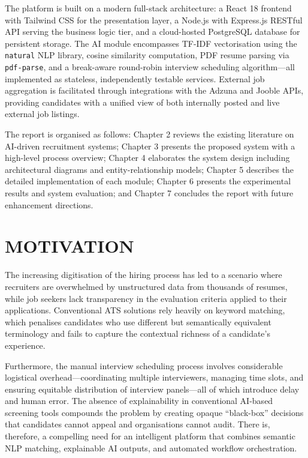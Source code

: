 \documentclass[12pt,a4paper]{report}
\begin{document}
The platform is built on a modern full-stack architecture: a React 18 frontend with Tailwind CSS for the presentation layer, a Node.js with Express.js RESTful API serving the business logic tier, and a cloud-hosted PostgreSQL database for persistent storage. The AI module encompasses TF-IDF vectorisation using the \texttt{natural} NLP library, cosine similarity computation, PDF resume parsing via \texttt{pdf-parse}, and a break-aware round-robin interview scheduling algorithm---all implemented as stateless, independently testable services. External job aggregation is facilitated through integrations with the Adzuna and Jooble APIs, providing candidates with a unified view of both internally posted and live external job listings.

The report is organised as follows: Chapter 2 reviews the existing literature on AI-driven recruitment systems; Chapter 3 presents the proposed system with a high-level process overview; Chapter 4 elaborates the system design including architectural diagrams and entity-relationship models; Chapter 5 describes the detailed implementation of each module; Chapter 6 presents the experimental results and system evaluation; and Chapter 7 concludes the report with future enhancement directions.

\section{MOTIVATION}

The increasing digitisation of the hiring process has led to a scenario where recruiters are overwhelmed by unstructured data from thousands of resumes, while job seekers lack transparency in the evaluation criteria applied to their applications. Conventional ATS solutions rely heavily on keyword matching, which penalises candidates who use different but semantically equivalent terminology and fails to capture the contextual richness of a candidate's experience.

Furthermore, the manual interview scheduling process involves considerable logistical overhead---coordinating multiple interviewers, managing time slots, and ensuring equitable distribution of interview panels---all of which introduce delay and human error. The absence of explainability in conventional AI-based screening tools compounds the problem by creating opaque ``black-box'' decisions that candidates cannot appeal and organisations cannot audit. There is, therefore, a compelling need for an intelligent platform that combines semantic NLP matching, explainable AI outputs, and automated workflow orchestration.
\end{document}
